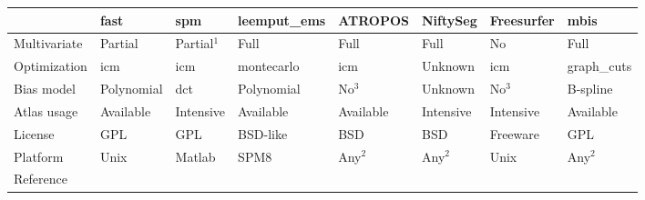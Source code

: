 \begin{tabularx}{\textwidth}{l|ZZZZZZ||Z}
\hline
              & \acrshort*{fast} & \acrshort*{spm} & \acrshort*{leemput_ems}     & ATROPOS    & NiftySeg & Freesurfer & \gls*{mbis} \\
\hline
Multivariate  & Partial    & Partial$^{1}$ & Full       & Full      &  Full      & No  & Full \\
Optimization  & \acrshort*{icm}  & \acrshort*{icm} & \acrshort*{montecarlo}& \acrshort*{icm}  & Unknown   & \acrshort*{icm} & \acrshort*{graph_cuts} \\
Bias model    & Polynomial & \acrshort*{dct} & Polynomial & No$^{3}$  & Unknown & No$^{3}$ & B-spline \\
Atlas usage   & Available  & Intensive & Available  & Available &  Intensive & Intensive & Available \\
License       & GPL        & GPL       & BSD-like   & BSD       &  BSD       & Freeware & GPL \\
Platform      & Unix       & Matlab    & SPM8       & Any$^{2}$       &  Any$^{2}$       & Unix & Any$^{2}$ \\
Reference     & \citep{zhang_segmentation_2001} & \citep{ashburner_unified_2005} & \citep{van_leemput_unifying_2003} & \citep{avants_open_2011} & \citep{cardoso_niftyseg:_2012} & 
\citep{fischl_whole_2002} & \\
\hline
\end{tabularx}